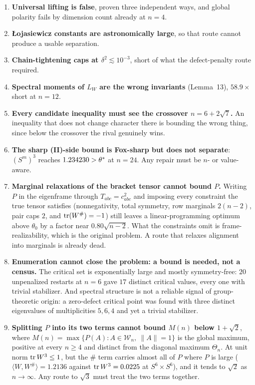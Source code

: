 \begin{enumerate}[leftmargin=1.8em]
\item \textbf{Universal lifting is false}, proven three independent ways, and global polarity fails by dimension count already at $n=4$.
\item \textbf{{\L}ojasiewicz constants are astronomically large}, so that route cannot produce a usable separation.
\item \textbf{Chain-tightening caps at $\delta^2\lesssim10^{-3}$}, short of what the defect-penalty route required.
\item \textbf{Spectral moments of $L_W$ are the wrong invariants} (Lemma~13), $58.9\times$ short at $n=12$.
\item \textbf{Every candidate inequality must see the crossover $n=6+2\sqrt7$.} An inequality that does not change character there is bounding the wrong thing, since below the crossover the rival genuinely wins.
\item \textbf{The sharp (II)-side bound is Fox-sharp but does not separate}: $(S^m)^3$ reaches $1.234230>\theta^{*}$ at $n=24$. Any repair must be $n$- or value-aware.
\item \textbf{Marginal relaxations of the bracket tensor cannot bound $P$.} Writing $P$ in the eigenframe through $T_{abc}=c_{abc}^2$ and imposing every constraint the true tensor satisfies (nonnegativity, total symmetry, row marginals $2(n-2)$, pair caps $2$, and $\operatorname{tr}(W^{\#})=-1$) still leaves a linear-programming optimum above $\theta_0$ by a factor near $0.80\sqrt{n-2}$. What the constraints omit is frame-realizability, which is the original problem. A route that relaxes alignment into marginals is already dead.
\item \textbf{Enumeration cannot close the problem: a bound is needed, not a census.} The critical set is exponentially large and mostly symmetry-free: $20$ unpenalized restarts at $n=6$ gave $17$ distinct critical values, every one with trivial stabilizer. And spectral structure is not a reliable signal of group-theoretic origin: a zero-defect critical point was found with three distinct eigenvalues of multiplicities $5,6,4$ and yet a trivial stabilizer.

\item \textbf{Splitting $P$ into its two terms cannot bound $M(n)$ below $1+\sqrt2$}, where $M(n)=\max\{P(A):A\in\mathcal W_n,\ \lVert A\rVert=1\}$ is the global maximum, positive at every $n\ge4$ and distinct from the diagonal maximum $\Theta_n$. At unit norm $\operatorname{tr} W^3\le1$, but the $\#$ term carries almost all of $P$ where $P$ is large ($\langle W,W^{\#}\rangle=1.2136$ against $\operatorname{tr} W^3=0.0225$ at $S^6\times S^6$), and it tends to $\sqrt2$ as $n\to\infty$. Any route to $\sqrt3$ must treat the two terms together.


\end{enumerate}

